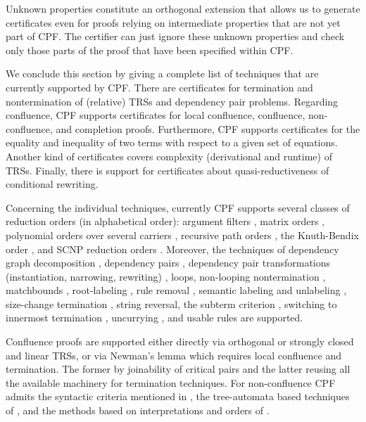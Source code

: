 \documentclass[USenglish]{eptcs}
\begin{document}
Unknown properties constitute an orthogonal extension that allows us to generate
certificates even for proofs relying on intermediate properties that are not yet
part of CPF. The certifier can just ignore these unknown properties and check
only those parts of the proof that have been specified within CPF.

We conclude this section by giving a complete list of techniques that are
currently supported by CPF. There are certificates for termination and nontermination of
(relative) TRSs and dependency pair problems.  Regarding confluence, CPF
supports certificates for local confluence, confluence, non-confluence, and
completion proofs. Furthermore, CPF supports certificates for the equality and
inequality of two terms with respect to a given set of equations. Another kind
of certificates covers complexity (derivational and runtime) of TRSs. Finally,
there is support for certificates about quasi-reductiveness
of conditional rewriting.

Concerning the individual techniques, 
currently CPF supports several classes of reduction orders
(in alphabetical order): 
argument filters \cite{AG00},
matrix orders \cite{EWZ08},
polynomial orders over several carriers \cite{L79,arctic,rational},
recursive path orders \cite{D87},
the Knuth-Bendix order \cite{KB70}, and 
SCNP reduction orders \cite{CFGSK10}.
Moreover, the techniques of 
dependency graph decomposition \cite{AG00}, 
dependency pairs \cite{AG00,dp-framework}, 
dependency pair transformations (instantiation, narrowing, rewriting) \cite{AG00,dp-framework},
loops,
non-looping nontermination \cite{EEG12},
matchbounds \cite{matchbounds},
root-labeling \cite{root-labeling}, 
rule removal \cite{L79,HM07},
semantic labeling and unlabeling \cite{Z95}, 
size-change termination \cite{LJBA01,AAECC05}, 
string reversal, 
the subterm criterion \cite{HM07}, 
switching to innermost termination \cite{G95},
uncurrying \cite{UncurryHMZ,UncurryST}, 
and usable rules \cite{AG00,U01,dp-framework}
are supported.

Confluence proofs are supported either directly via orthogonal or strongly closed
and linear TRSs, or via Newman's
lemma which requires local confluence and termination. The former by joinability
of critical pairs and the latter reusing all the available machinery for
termination techniques. For non-confluence CPF admits the syntactic criteria mentioned
in \cite{csi}, the tree-automata based techniques of \cite{FT14}, and the methods
based on interpretations and orders of \cite{Aoto13}.
\end{document}
